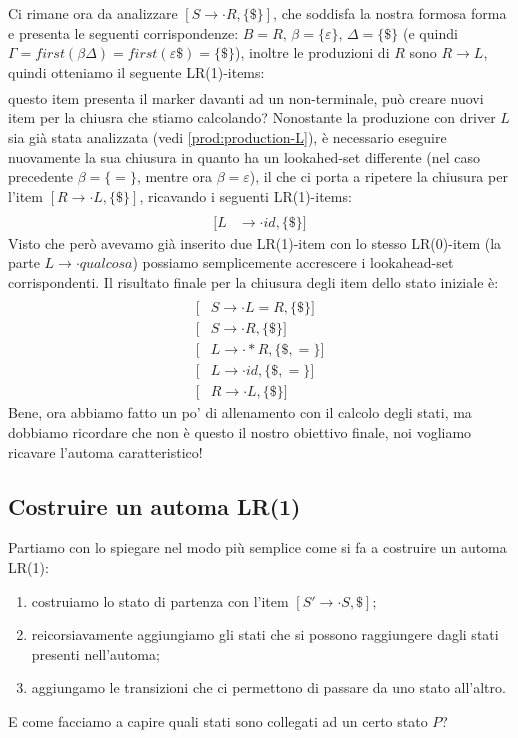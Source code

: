 \documentclass[class=book, crop=false, oneside, 12pt]{standalone}
\begin{document}
Ci rimane ora da analizzare \([S \to \cdot R, \{\$\}]\), che soddisfa la nostra formosa forma e presenta le seguenti corrispondenze: \(B = R \texttt{, } \beta = \{\varepsilon\} \texttt{, } \Delta = \{\$\}\) (e quindi \(\Gamma = first(\beta \Delta) = first(\varepsilon \$) = \{\$\}\)), inoltre le produzioni di \(R\) sono \(R \to L\), quindi otteniamo il seguente LR(1)-items:
\begin{align*}
    [R &\to \cdot L, \{\$\}]
\end{align*}
questo item presenta il marker davanti ad un non-terminale, può creare nuovi item per la chiusra che stiamo calcolando?
Nonostante la produzione con driver \(L\) sia già stata analizzata (vedi \ref{prod:production-L}), è necessario eseguire nuovamente la sua chiusura in quanto ha un lookahed-set differente (nel caso precedente \(\beta= \{=\}\), mentre ora \(\beta=\varepsilon\)), il che ci porta a ripetere la chiusura per l'item \([R \to \cdot L, \{\$\}]\), ricavando i seguenti LR(1)-items:
\begin{align*}
    [L &\to \cdot *R, \{\$\}] \\
    [L &\to \cdot id, \{\$\}]
\end{align*}
Visto che però avevamo già inserito due LR(1)-item con lo stesso LR(0)-item (la parte \(L \to \cdot qualcosa\)) possiamo semplicemente accrescere i lookahead-set corrispondenti. Il risultato finale per la chiusura degli item dello stato iniziale è:
\begin{align*}
    [&S'\to \cdot S, \{\$\}] \\
    [&S \to \cdot L = R, \{\$\}] \\
    [&S \to \cdot R, \{\$\}] \\
    [&L \to \cdot *R, \{\$, =\}] \\
    [&L \to \cdot id, \{\$, =\}] \\
    [&R \to \cdot L, \{\$\}]
\end{align*}
Bene, ora abbiamo fatto un po' di allenamento con il calcolo degli stati, ma dobbiamo ricordare che non è questo il nostro obiettivo finale, noi vogliamo ricavare l'automa caratteristico!

\subsection{Costruire un automa LR(1)}
Partiamo con lo spiegare nel modo più semplice come si fa a costruire un automa LR(1):
\begin{enumerate}
    \item costruiamo lo stato di partenza con l'item \([S' \to \cdot S, {\$}]\);
    \item reicorsiavamente aggiungiamo gli stati che si possono raggiungere dagli stati presenti nell'automa;
    \item aggiungamo le transizioni che ci permettono di passare da uno stato all'altro.
\end{enumerate}
E come facciamo a capire quali stati sono collegati ad un certo stato \(P\)?
\end{document}
